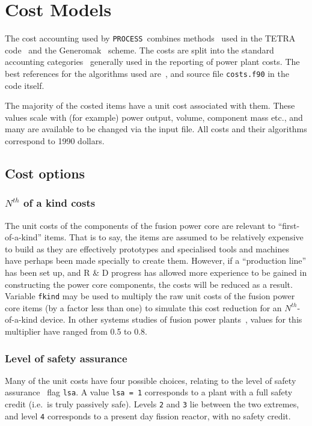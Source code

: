 \documentclass[11pt,a4paper]{report}
\newcommand{\process}{\mbox{\texttt{PROCESS}}}
\begin{document}
\section{Cost Models}

The cost accounting used by \process\ combines methods~\cite{cost1} used in
the TETRA code~\cite{tetra} and the Generomak~\cite{generomak} scheme.  The
costs are split into the standard accounting categories~\cite{cost2} generally
used in the reporting of power plant costs. The best references for the
algorithms used are~\cite{storac}, and source file \texttt{costs.f90} in the
code itself.

The majority of the costed items have a unit cost associated with them. These
values scale with (for example) power output, volume, component mass etc., and
many are available to be changed via the input file. All costs and their
algorithms correspond to 1990 dollars.

\subsection{Cost options}

\subsubsection{$N^{th}$ of a kind costs}

The unit costs of the components of the fusion power core are relevant to
``first-of-a-kind'' items. That is to say, the items are assumed to be
relatively expensive to build as they are effectively prototypes and
specialised tools and machines have perhaps been made specially to create
them. However, if a ``production line'' has been set up, and R \& D progress
has allowed more experience to be gained in constructing the power core
components, the costs will be reduced as a result. Variable \texttt{fkind} may
be used to multiply the raw unit costs of the fusion power core items (by a
factor less than one) to simulate this cost reduction for an
$N^{th}$-of-a-kind device. In other systems studies of fusion power
plants~\cite{galambos}, values for this multiplier have ranged from 0.5 to
0.8.

\subsubsection{Level of safety assurance}

Many of the unit costs have four possible choices, relating to the level of
safety assurance~\cite{lsa} flag \texttt{lsa}. A value \texttt{lsa = 1}
corresponds to a plant with a full safety credit (i.e.\ is truly passively
safe). Levels \texttt{2} and \texttt{3} lie between the two extremes, and
level \texttt{4} corresponds to a present day fission reactor, with no safety
credit.
\end{document}
